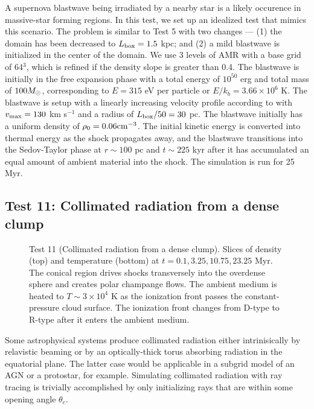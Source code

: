 \documentclass[12pt,preprint]{aastex}
\begin{document}
A supernova blastwave being irradiated by a nearby star is a likely
occurence in massive-star forming regions.  In this test, we set up an
idealized test that mimics this scenario.  The problem is similar to
Test 5 with two changes --- (1) the domain has been decreased to
$L_{\rm box} = 1.5$ kpc; and (2) a mild blastwave is initialized in
the center of the domain.  We use 3 levels of AMR with a base grid of
64$^3$, which is refined if the density slope is greater than 0.4.
The blastwave is initially in the free expansion phase with a total
energy of $10^{50}$ erg and total mass of $100 \Ms$, corresponding to
$E = 315$ eV per particle or $E/k_b = 3.66 \times 10^6$ K.  The
blastwave is setup with a linearly increasing velocity profile
according to \citet{Truelove99} with $v_{\rm max} = 130$ km s$^{-1}$
and a radius of $L_{\rm box}/50 = 30$ pc.  The blastwave initially has
a uniform density of $\rho_0 = 0.06 \cubecm$.  The initial kinetic
energy is converted into thermal energy as the shock propagates away,
and the blastwave transitions into the Sedov-Taylor phase at $r \sim
100$ pc and $t \sim 225$ kyr after it has accumulated an equal amount
of ambient material into the shock.  The simulation is run for 25 Myr.

\subsection{Test 11: Collimated radiation from a dense clump}

\begin{figure}[t]
  \caption{\label{fig:test11} Test 11 (Collimated radiation from a
    dense clump).  Slices of density (top) and temperature (bottom) at
    $t = 0.1, 3.25, 10.75, 23.25$ Myr.  The conical  region
    drives shocks transversely into the overdense sphere and creates
    polar champange flows.  The ambient medium is heated to $T \sim 3
    \times 10^4$ K as the ionization front passes the
    constant-pressure cloud surface.  The ionization front changes
    from D-type to R-type after it enters the ambient medium.}
\end{figure}

Some astrophysical systems produce collimated radiation either
intrinisically by relavistic beaming or by an optically-thick torus
absorbing radiation in the equatorial plane.  The latter case would be
applicable in a subgrid model of an AGN or a protostar, for example.
Simulating collimated radiation with ray tracing is trivially
accomplished by only initializing rays that are within some opening
angle $\theta_c$.
\end{document}
